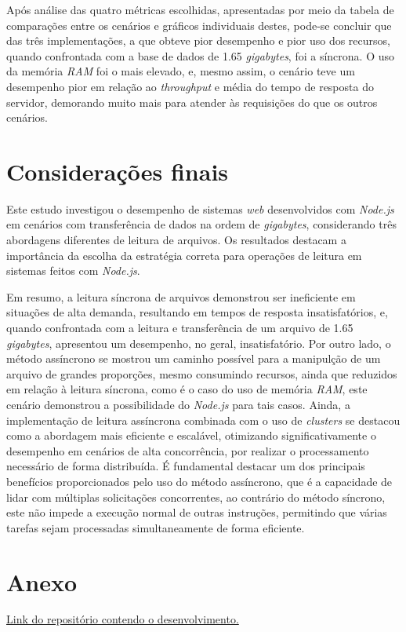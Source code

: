 \documentclass[12pt]{article}
\begin{document}
Após análise das quatro métricas escolhidas, apresentadas por meio da tabela de comparações
entre os cenários e gráficos individuais destes, pode-se concluir que das três 
implementações, a que obteve pior desempenho e pior uso dos recursos, quando confrontada 
com a base de dados de 1.65 \textit{gigabytes}, foi a síncrona. O uso da memória \textit{RAM}
foi o mais elevado, e, mesmo assim, o cenário teve um desempenho pior em relação ao 
\textit{throughput} e média do tempo de resposta do servidor, demorando muito mais
para atender às requisições do que os outros cenários.


\section{Considerações finais}

Este estudo investigou o desempenho de sistemas \textit{web} desenvolvidos com \textit{Node.js} em cenários com transferência de dados
na ordem de \textit{gigabytes}, considerando três abordagens diferentes de leitura de arquivos. Os resultados destacam
a importância da escolha da estratégia correta para operações de leitura em sistemas feitos com \textit{Node.js}.

Em resumo, a leitura síncrona de arquivos demonstrou ser ineficiente em situações de alta demanda, resultando em 
tempos de resposta insatisfatórios, e, quando confrontada com a leitura e transferência de um arquivo de 1.65 \textit{gigabytes},
apresentou um desempenho, no geral, insatisfatório. Por outro lado, o método assíncrono se mostrou um caminho possível para a manipulção de um arquivo de
grandes proporções, mesmo consumindo recursos, ainda que reduzidos em relação à leitura síncrona, como é o caso do uso de
memória \textit{RAM}, este cenário demonstrou a possibilidade do \textit{Node.js} para tais casos. Ainda, a implementação 
de leitura assíncrona combinada com o uso de \textit{clusters} se destacou como a abordagem mais eficiente e escalável, otimizando 
significativamente o desempenho em cenários de alta concorrência, por realizar o processamento necessário de forma distribuída. 
É fundamental destacar um dos principais benefícios proporcionados pelo uso do método assíncrono, que é a capacidade de lidar 
com múltiplas solicitações concorrentes, ao contrário do método síncrono, este não impede a execução normal 
de outras instruções, permitindo que várias tarefas sejam processadas simultaneamente de forma eficiente.




\section*{Anexo}

\href{https://github.com/MarcosKrul/tcc%7D%7B}{Link do repositório contendo o desenvolvimento.}
\end{document}
